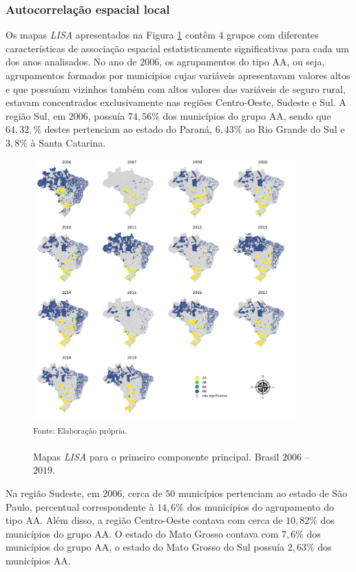 \subsubsection{Autocorrelação espacial local}

Os mapas \textit{LISA} apresentados na Figura \ref{map_lisa_cp1} contêm $4$ grupos com diferentes características de associação espacial estatisticamente significativas para cada um dos anos analisados. No ano de $2006$, os agrupamentos do tipo AA, ou seja, agrupamentos formados por municípios cujas variáveis apresentavam valores altos e que possuíam vizinhos também com altos valores das variáveis de seguro rural, estavam concentrados exclusivamente nas regiões Centro-Oeste, Sudeste e Sul. A região Sul, em $2006$, possuía $74,56\%$ dos municípios do grupo AA, sendo que $64,32,\%$ destes pertenciam ao estado do Paraná, $6,43\%$  ao Rio Grande do Sul e $3,8\%$ à Santa Catarina.  

\begin{figure}[H]
	\centering
	\caption{Mapas \textit{LISA} para o primeiro componente principal.  Brasil $2006$ -- $2019$.}
	\includegraphics[width=0.9\textwidth]{figuras/map_lisa_cp1_viridis.png}\\
	\small \textsuperscript {Fonte: Elaboração própria.}
    \label{map_lisa_cp1}
\end{figure}

Na região Sudeste, em $2006$, cerca de $50$ municípios pertenciam ao estado de São Paulo, percentual correspondente à  $14,6\%$ dos municípios do agrupamento do tipo AA. Além disso, a região Centro-Oeste contava com cerca de $10,82\%$ dos municípios do grupo AA. O estado do Mato Grosso contava com $7,6\%$ dos municípios do grupo AA, o estado do Mato Grosso do Sul possuía $2,63\%$ dos municípios AA. 


